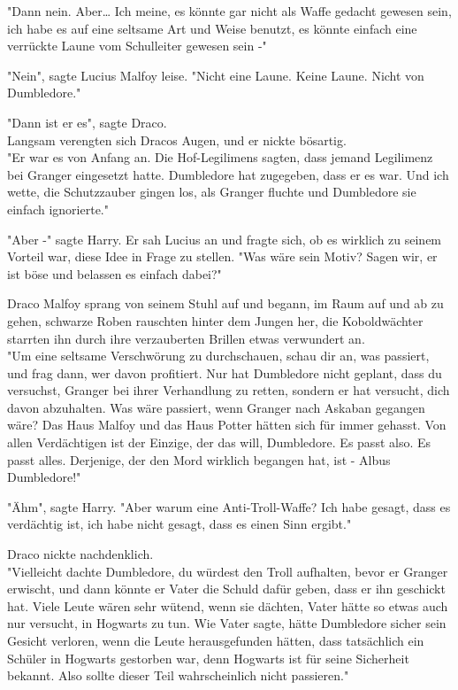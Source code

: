 {"Dann nein. Aber… Ich meine, es könnte gar nicht als Waffe gedacht gewesen sein, ich habe es auf eine seltsame Art und Weise benutzt, es könnte einfach eine verrückte Laune vom Schulleiter gewesen sein -"

"Nein", sagte Lucius Malfoy leise. "Nicht eine Laune. Keine Laune. Nicht von Dumbledore."

"Dann ist er es", sagte Draco.\\ Langsam verengten sich Dracos Augen, und er nickte bösartig.\\ "Er war es von Anfang an. Die Hof-Legilimens sagten, dass jemand Legilimenz bei Granger eingesetzt hatte. Dumbledore hat zugegeben, dass er es war. Und ich wette, die Schutzzauber gingen los, als Granger fluchte und Dumbledore sie einfach ignorierte."

"Aber -" sagte Harry. Er sah Lucius an und fragte sich, ob es wirklich zu seinem Vorteil war, diese Idee in Frage zu stellen. "Was wäre sein Motiv? Sagen wir, er ist böse und belassen es einfach dabei?"

Draco Malfoy sprang von seinem Stuhl auf und begann, im Raum auf und ab zu gehen, schwarze Roben rauschten hinter dem Jungen her, die Koboldwächter starrten ihn durch ihre verzauberten Brillen etwas verwundert an.\\ "Um eine seltsame Verschwörung zu durchschauen, schau dir an, was passiert, und frag dann, wer davon profitiert. Nur hat Dumbledore nicht geplant, dass du versuchst, Granger bei ihrer Verhandlung zu retten, sondern er hat versucht, dich davon abzuhalten. Was wäre passiert, wenn Granger nach Askaban gegangen wäre? Das Haus Malfoy und das Haus Potter hätten sich für immer gehasst. Von allen Verdächtigen ist der Einzige, der das will, Dumbledore. Es passt also. Es passt alles. Derjenige, der den Mord wirklich begangen hat, ist - Albus Dumbledore!"

"Ähm", sagte Harry. "Aber warum eine Anti-Troll-Waffe? Ich habe gesagt, dass es verdächtig ist, ich habe nicht gesagt, dass es einen Sinn ergibt."

Draco nickte nachdenklich.\\ "Vielleicht dachte Dumbledore, du würdest den Troll aufhalten, bevor er Granger erwischt, und dann könnte er Vater die Schuld dafür geben, dass er ihn geschickt hat. Viele Leute wären sehr wütend, wenn sie dächten, Vater hätte so etwas auch nur versucht, in Hogwarts zu tun. Wie Vater sagte, hätte Dumbledore sicher sein Gesicht verloren, wenn die Leute herausgefunden hätten, dass tatsächlich ein Schüler in Hogwarts gestorben war, denn Hogwarts ist für seine Sicherheit bekannt. Also sollte dieser Teil wahrscheinlich nicht passieren."

}
